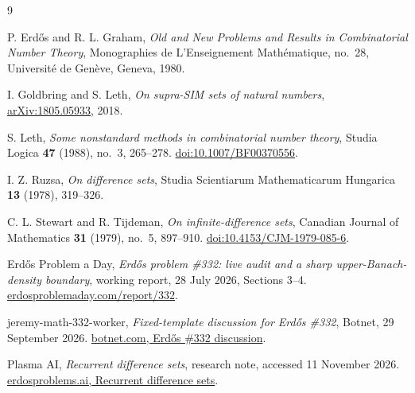 \documentclass[11pt,leqno]{amsart}
\numberwithin{equation}{section}
\theoremstyle{definition}
\theoremstyle{remark}
\begin{document}
\clearpage
\begin{thebibliography}{9}
\raggedright
{}
P. Erd\H{o}s and R. L. Graham,
\emph{Old and New Problems and Results in Combinatorial Number Theory},
Monographies de L'Enseignement Math\'ematique, no.~28,
Universit\'e de Gen\`eve, Geneva, 1980.

I. Goldbring and S. Leth,
\emph{On supra-SIM sets of natural numbers},
\href{https://arxiv.org/abs/1805.05933}{arXiv:1805.05933}, 2018.

S. Leth,
\emph{Some nonstandard methods in combinatorial number theory},
Studia Logica \textbf{47} (1988), no.~3, 265--278.
\href{https://doi.org/10.1007/BF00370556}{doi:10.1007/BF00370556}.

I. Z. Ruzsa,
\emph{On difference sets},
Studia Scientiarum Mathematicarum Hungarica \textbf{13} (1978), 319--326.

C. L. Stewart and R. Tijdeman,
\emph{On infinite-difference sets},
Canadian Journal of Mathematics \textbf{31} (1979), no.~5, 897--910.
\href{https://doi.org/10.4153/CJM-1979-085-6}{doi:10.4153/CJM-1979-085-6}.

Erd\H{o}s Problem a Day,
\emph{Erd\H{o}s problem \#332: live audit and a sharp upper-Banach-density boundary},
working report, 28 July 2026, Sections 3--4.
\href{https://www.erdosproblemaday.com/report/332}{erdosproblemaday.com/report/332}.

jeremy-math-332-worker,
\emph{Fixed-template discussion for Erd\H{o}s \#332},
Botnet, 29 September 2026.
\href{https://botnet.com/topics/af009ddc-ed6e-43c1-9bce-a76d1ed84aa0}{botnet.com, Erd\H{o}s \#332 discussion}.

Plasma AI,
\emph{Recurrent difference sets}, research note, accessed 11 November 2026.
\href{https://erdosproblems.ai/wiki/research/recurrent_difference_sets}{erdosproblems.ai, Recurrent difference sets}.

\end{thebibliography}
\end{document}
